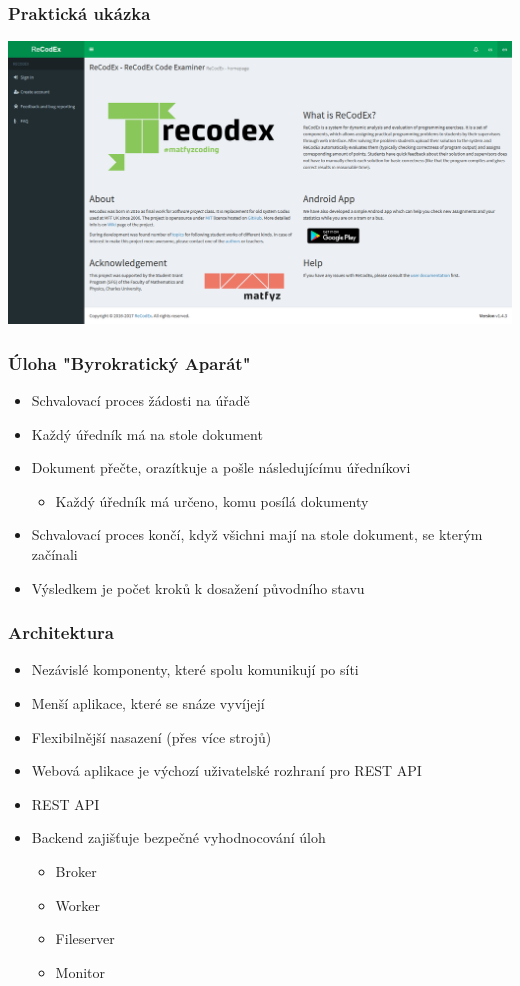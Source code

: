 \documentclass{beamer}
\begin{document}
\begin{frame}
	\frametitle{Praktická ukázka}
	\begin{center}
		\includegraphics[width=1\textwidth]{images/recodex-screen.png}
	\end{center}
\end{frame}

\begin{frame}
	\frametitle{Úloha "Byrokratický Aparát"}
	\begin{itemize}
		\item Schvalovací proces žádosti na úřadě
		\item Každý úředník má na stole dokument
		\item Dokument přečte, orazítkuje a pošle následujícímu úředníkovi
		\begin{itemize}
			\item Každý úředník má určeno, komu posílá dokumenty
		\end{itemize}
		\item Schvalovací proces končí, když všichni mají na stole dokument, se kterým začínali
		\item Výsledkem je počet kroků k dosažení původního stavu
	\end{itemize}
\end{frame}

\begin{frame}
	\frametitle{Architektura}
	\begin{itemize}
		\item Nezávislé komponenty, které spolu komunikují po síti
		\item Menší aplikace, které se snáze vyvíjejí
		\item Flexibilnější nasazení (přes více strojů)
		\item Webová aplikace je výchozí uživatelské rozhraní pro REST API
		\item REST API 
		\item Backend zajišťuje bezpečné vyhodnocování úloh
		\begin{itemize}
			\item Broker
			\item Worker
			\item Fileserver
			\item Monitor
		\end{itemize}
	\end{itemize}
\end{frame}
\end{document}
